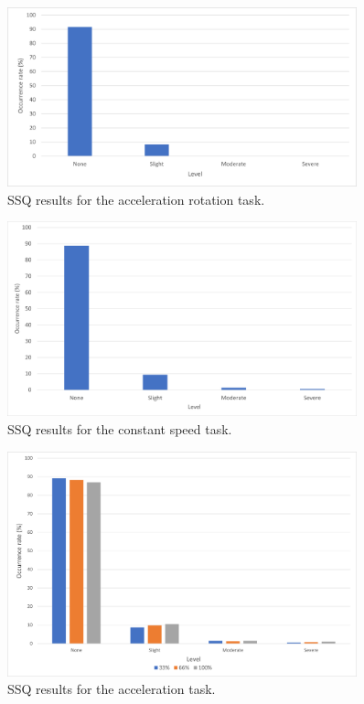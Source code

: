 \begin{figure}[H]\centering
	\includegraphics[width=0.9\textwidth]{Pictures/SSQ_Acc_Of_RotationEx.png}%
	\caption{SSQ results for the acceleration rotation task.}\label{fig:SSQ_Acc_Of_RotationEx}%

\end{figure}
\begin{figure}[H]\centering
	\includegraphics[width=0.9\textwidth]{Pictures/SSQ_ConstantOfCurvatureEx.png}%
	\caption{SSQ results for the constant speed task.}\label{fig:SSQ_ConstantOfCurvatureEx}%
	
\end{figure}
\begin{figure}[H]\centering
	\includegraphics[width=0.9\textwidth]{Pictures/SSQ_AccOfCurvatureEx.png}%
	\caption{SSQ results for the acceleration task.}\label{fig:SSQ_AccOfCurvatureEx}%
	
\end{figure}
